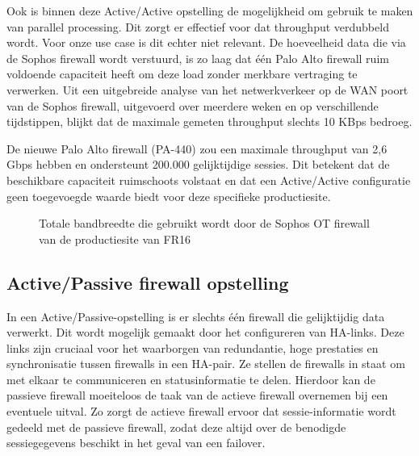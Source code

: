 \newpage

Ook is binnen deze Active/Active opstelling de mogelijkheid om gebruik te maken van parallel processing. Dit zorgt er effectief voor dat throughput verdubbeld wordt. \autocite{Fulp2006} Voor onze use case is dit echter niet relevant. De hoeveelheid data die via de Sophos firewall wordt verstuurd, is zo laag dat één Palo Alto firewall ruim voldoende capaciteit heeft om deze load zonder merkbare vertraging te verwerken. Uit een uitgebreide analyse van het netwerkverkeer op de WAN poort van de Sophos firewall, uitgevoerd over meerdere weken en op verschillende tijdstippen, blijkt dat de maximale gemeten throughput slechts 10 KBps bedroeg.


De nieuwe Palo Alto firewall (PA-440) zou een maximale throughput van 2,6 Gbps hebben en ondersteunt 200.000 gelijktijdige sessies. \autocite{PaloAltoDS2025} Dit betekent dat de beschikbare capaciteit ruimschoots volstaat en dat een Active/Active configuratie geen toegevoegde waarde biedt voor deze specifieke productiesite.

\begin{figure}[H]
    \centering
    \caption[Sophos firewall bandwidth graph]{\label{fig:grail}Totale bandbreedte die gebruikt wordt door de Sophos OT firewall van de productiesite van FR16}
\end{figure}




\subsection{Active/Passive firewall opstelling}

In een Active/Passive-opstelling is er slechts één firewall die gelijktijdig data verwerkt. Dit wordt mogelijk gemaakt door het configureren van HA-links. Deze links zijn cruciaal voor het waarborgen van redundantie, hoge prestaties en synchronisatie tussen firewalls in een HA-pair. Ze stellen de firewalls in staat om met elkaar te communiceren en statusinformatie te delen. Hierdoor kan de passieve firewall moeiteloos de taak van de actieve firewall overnemen bij een eventuele uitval. Zo zorgt de actieve firewall ervoor dat sessie-informatie wordt gedeeld met de passieve firewall, zodat deze altijd over de benodigde sessiegegevens beschikt in het geval van een failover. \autocite{PaloAltoHA2025} \autocite{PaloAltoHAb2025}

